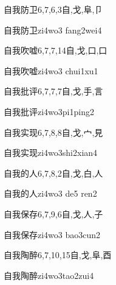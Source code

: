 \begin{Entry}{自我防卫}{6,7,6,3}{⾃,⼽,⾩,⼙}
  \begin{Phonetics}{自我防卫}{zi4wo3 fang2wei4}
  \end{Phonetics}
\end{Entry}

\begin{Entry}{自我吹嘘}{6,7,7,14}{⾃,⼽,⼝,⼝}
  \begin{Phonetics}{自我吹嘘}{zi4wo3 chui1xu1}
  \end{Phonetics}
\end{Entry}

\begin{Entry}{自我批评}{6,7,7,7}{⾃,⼽,⼿,⾔}
  \begin{Phonetics}{自我批评}{zi4wo3pi1ping2}
  \end{Phonetics}
\end{Entry}

\begin{Entry}{自我实现}{6,7,8,8}{⾃,⼽,⼧,⾒}
  \begin{Phonetics}{自我实现}{zi4wo3shi2xian4}
  \end{Phonetics}
\end{Entry}

\begin{Entry}{自我的人}{6,7,8,2}{⾃,⼽,⽩,⼈}
  \begin{Phonetics}{自我的人}{zi4wo3 de5 ren2}
  \end{Phonetics}
\end{Entry}

\begin{Entry}{自我保存}{6,7,9,6}{⾃,⼽,⼈,⼦}
  \begin{Phonetics}{自我保存}{zi4wo3 bao3cun2}
  \end{Phonetics}
\end{Entry}

\begin{Entry}{自我陶醉}{6,7,10,15}{⾃,⼽,⾩,⾣}
  \begin{Phonetics}{自我陶醉}{zi4wo3tao2zui4}
  \end{Phonetics}
\end{Entry}

